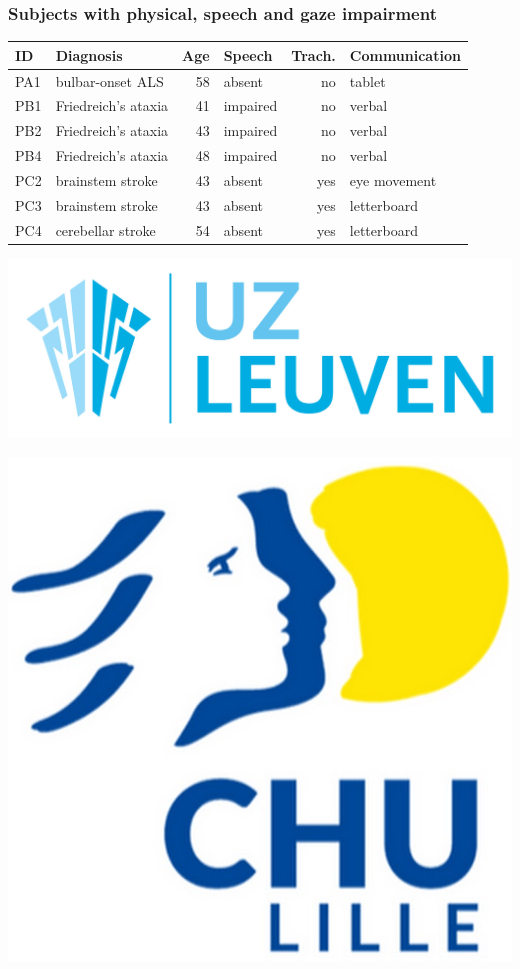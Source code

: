\documentclass{kul-ulille-beamer}
\begin{document}
\begin{frame}
  \frametitle{Subjects with physical, speech and gaze impairment}

  \begin{minipage}[c]{.9\textwidth}
  \begin{tabular}{@{}l|lrlrl@{}}
      \textbf{ID}  & \textbf{Diagnosis} & \textbf{Age} &
      \textbf{Speech} & \textbf{Trach.} & \textbf{Communication} \\ \hline
      PA1 & bulbar-onset ALS & 58  & absent  & no          & tablet                 \\
      PB1 & Friedreich's ataxia & 41  & impaired & no          & verbal                 \\
      PB2 & Friedreich's ataxia & 43  & impaired & no          & verbal                 \\
      PB4 & Friedreich's ataxia & 48  & impaired & no          & verbal                 \\
      PC2 & brainstem stroke & 43  & absent  & yes         &  eye movement \\
      PC3 & brainstem stroke & 43  & absent  & yes         & letterboard            \\
      PC4 & cerebellar stroke & 54  & absent  & yes         & letterboard \\
  \end{tabular}
  \end{minipage}\hfill%
  \begin{minipage}[c]{.1\textwidth}
    \centering
    \includegraphics[width=\textwidth]{figures/logos/uz_leuven.jpg}
    \smallskip

    \includegraphics[width=.8\textwidth]{figures/logos/chu_lille.png}
    \smallskip


\end{minipage}
\end{frame}
\end{document}
